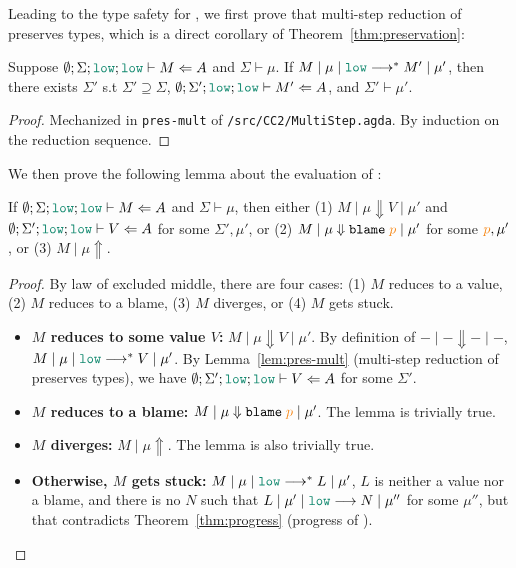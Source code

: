 {\color{NavyBlue} %

Leading to the type safety for \Surface, we first prove that multi-step
reduction of \CC preserves types, which is a direct corollary of
Theorem~\ref{thm:preservation}:

\begin{lemma}
  \label{lem:pres-mult}
  Suppose $\emptyset ; \Sigma ; \low ; \low \vdash M \Leftarrow A$ and $\Sigma \vdash \mu$.
  If $\reducemult{M}{\mu}{\low}{M'}{\mu'}$,
  then there exists $\Sigma'$ s.t $\Sigma' \supseteq \Sigma$, $\emptyset ; \Sigma' ; \low ; \low \vdash M' \Leftarrow A$,
  and $\Sigma' \vdash \mu'$.
\end{lemma}
\begin{proof}
  Mechanized in \texttt{pres-mult} of \texttt{/src/CC2/MultiStep.agda}. By
  induction on the reduction sequence.
\end{proof}

We then prove the following lemma about the evaluation of \CC:

\begin{lemma}
  \label{lem:pres-bigstep}
  If $\emptyset ; \Sigma ; \low ; \low \vdash M \Leftarrow A$ and $\Sigma \vdash
  \mu$, then either (1) $M \mid \mu \Downarrow V \mid \mu'$ and $\emptyset ;
  \Sigma' ; \low ; \low \vdash V \Leftarrow A$ for some $\Sigma', \mu'$, or (2)
  $M \mid \mu \Downarrow \blame{p} \mid \mu'$ for some $\bl{p}, \mu'$, or (3) $M
  \mid \mu \Uparrow$.
\end{lemma}
\begin{proof}
  By law of excluded middle, there are four cases: (1) $M$ reduces to a value,
  (2) $M$ reduces to a blame, (3) $M$ diverges, or (4) $M$ gets stuck.
  \begin{itemize}
    \item \textbf{$M$ reduces to some value $V$:} $M \mid \mu \Downarrow V \mid
      \mu'$. By definition of ${-}\mid{-}\Downarrow{-}\mid{-}$,
      $\reducemult{M}{\mu}{\low}{V}{\mu'}$. By Lemma~\ref{lem:pres-mult}
      (multi-step reduction of \CC preserves types), we have $\emptyset ; \Sigma' ;
      \low ; \low \vdash V \Leftarrow A$ for some $\Sigma'$.
    \item \textbf{$M$ reduces to a blame:} $M \mid \mu \Downarrow \blame{p} \mid
      \mu'$. The lemma is trivially true.
    \item \textbf{$M$ diverges:} $M \mid \mu \Uparrow$. The lemma is also
      trivially true.
    \item \textbf{Otherwise, $M$ gets stuck:}
      $\reducemult{M}{\mu}{\low}{L}{\mu'}$, $L$ is neither a value nor a blame,
      and there is no $N$ such that $\reduce{L}{\mu'}{\low}{N}{\mu''}$ for some
      $\mu''$, but that contradicts Theorem~\ref{thm:progress} (progress of \CC).
  \end{itemize}
\end{proof}

}
